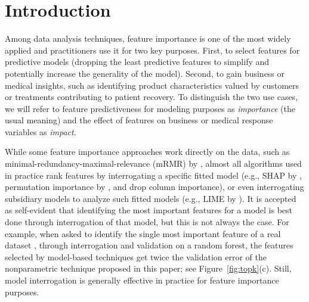 \documentclass[11pt]{article}
\newcommand{\figref}[1]{Figure~\ref{#1}}
\newcommand{\todo}[1]{{{\small\color{red}{[#1]}}}}
\begin{document}
\section{Introduction}
\label{sec:intro}

\todo{
integrating gradients for loss functions and neural networks

strobl  tree specific permutation importance

talk about gini drop and how it is biased; random var. but also doesn't use prediction.

Hooker's fix to gini drop

add how we tuned RF, other models. What is $R^2$?

we use all X,y
boston: 1 trial. min samples per x = 1
rent: defaults, 5 trials
flight: cat min samples leaf=2
bulldozer: default

tune GBM

update ALE bibtex
}

Among data analysis techniques, feature importance is one of the most widely applied and practitioners use it for two key purposes. First, to select features for predictive models (dropping the least predictive features to simplify and potentially increase the generality of the model). Second, to gain business or medical insights, such as identifying product characteristics valued by customers or treatments contributing to patient recovery.  To distinguish the two use cases, we will refer to feature predictiveness for modeling purposes as {\em importance} (the usual meaning) and the effect of features on business or medical response variables as {\em impact}.

While some feature importance approaches work directly on the data, such as minimal-redundancy-maximal-relevance (mRMR) by \cite{mRMR}, almost all algorithms used in practice rank features by interrogating a specific fitted model (e.g., SHAP by \citealt{shap}, permutation importance by \citealt{RF}, and drop column importance), or even interrogating subsidiary models to analyze such fitted models (e.g., LIME by \citealt{lime}). It is accepted as self-evident that identifying the most important features for a model is best done through interrogation of that  model, but this is not always the case.  For example, when asked to identify the single most important feature of a real dataset \citep{bulldozer}, through interrogation and validation on a random forest, the features selected by model-based techniques get twice the validation error of the nonparametric technique proposed in this paper; see \figref{fig:topk}(c). Still, model interrogation is generally effective in practice for feature importance purposes.
\end{document}
